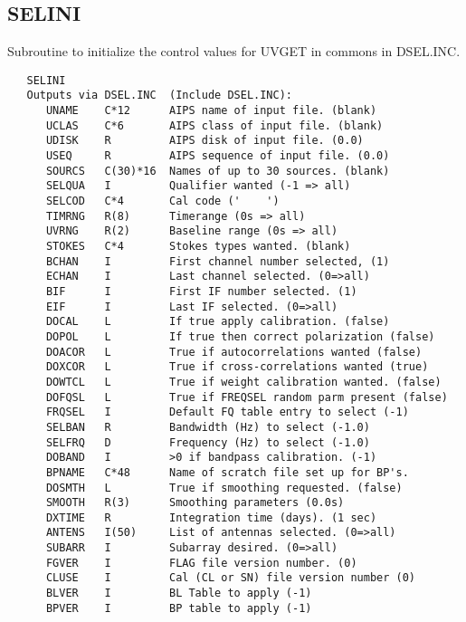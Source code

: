 \subsection{SELINI}
Subroutine to initialize the control values for UVGET in commons in
DSEL.INC.
\begin{verbatim}
   SELINI
   Outputs via DSEL.INC  (Include DSEL.INC):
      UNAME    C*12      AIPS name of input file. (blank)
      UCLAS    C*6       AIPS class of input file. (blank)
      UDISK    R         AIPS disk of input file. (0.0)
      USEQ     R         AIPS sequence of input file. (0.0)
      SOURCS   C(30)*16  Names of up to 30 sources. (blank)
      SELQUA   I         Qualifier wanted (-1 => all)
      SELCOD   C*4       Cal code ('    ')
      TIMRNG   R(8)      Timerange (0s => all)
      UVRNG    R(2)      Baseline range (0s => all)
      STOKES   C*4       Stokes types wanted. (blank)
      BCHAN    I         First channel number selected, (1)
      ECHAN    I         Last channel selected. (0=>all)
      BIF      I         First IF number selected. (1)
      EIF      I         Last IF selected. (0=>all)
      DOCAL    L         If true apply calibration. (false)
      DOPOL    L         If true then correct polarization (false)
      DOACOR   L         True if autocorrelations wanted (false)
      DOXCOR   L         True if cross-correlations wanted (true)
      DOWTCL   L         True if weight calibration wanted. (false)
      DOFQSL   L         True if FREQSEL random parm present (false)
      FRQSEL   I         Default FQ table entry to select (-1)
      SELBAN   R         Bandwidth (Hz) to select (-1.0)
      SELFRQ   D         Frequency (Hz) to select (-1.0)
      DOBAND   I         >0 if bandpass calibration. (-1)
      BPNAME   C*48      Name of scratch file set up for BP's.
      DOSMTH   L         True if smoothing requested. (false)
      SMOOTH   R(3)      Smoothing parameters (0.0s)
      DXTIME   R         Integration time (days). (1 sec)
      ANTENS   I(50)     List of antennas selected. (0=>all)
      SUBARR   I         Subarray desired. (0=>all)
      FGVER    I         FLAG file version number. (0)
      CLUSE    I         Cal (CL or SN) file version number (0)
      BLVER    I         BL Table to apply (-1)
      BPVER    I         BP table to apply (-1)
\end{verbatim}

